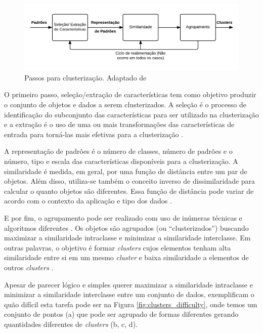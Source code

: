 \begin{figure}[h!]
\centering
\includegraphics[scale=0.5]{figuras/tasks_clustering.png}
\caption{Passos para clusterização. Adaptado de }
\label{fig:tasks_clustering}
\end{figure}

O primeiro passo, seleção/extração de características tem como objetivo produzir o conjunto de objetos e dados a serem clusterizados. 
A seleção é o processo de identificação do subconjunto das características para ser utilizado na clusterização e 
a extração é o uso de uma ou mais transformações das características de entrada para 
torná-las mais efetivas para a clusterização \cite{clustering_review}.

A representação de padrões é o número de classes, número de padrões e o número, tipo e escala
das características disponíveis para a clusterização.
A similaridade é medida, em geral, por uma função de distância entre um par de objetos. Além disso, utiliza-se também
o conceito inverso de dissimilaridade para calcular o quanto objetos são diferentes. Essa função de distância pode variar de acordo 
com o contexto da aplicação e tipo dos dados \cite{clustering_review}. 

E por fim, o agrupamento pode ser realizado com uso de inúmeras técnicas e algoritmos diferentes \cite{clustering_review}.
Os objetos são agrupados (ou ``clusterizados'') buscando maximizar a similaridade intraclasse e minimizar a similaridade interclasse.
Em outras palavras, o objetivo é formar \textit{clusters} cujos elementos tenham alta similaridade entre si em um mesmo \textit{cluster} 
e baixa similaridade a elementos de outros \textit{clusters} \cite{han2011data}.

Apesar de parecer lógico e simples querer maximizar a similaridade intraclasse e minimizar a similaridade interclasse entre um conjunto de dados, 
 exemplificam o quão difícil esta tarefa pode ser na Figura \ref{fig:clusters_difficulty}, onde temos um conjunto
de pontos (a) que pode ser agrupado de formas diferentes gerando quantidades diferentes de \textit{clusters} (b, c, d).

